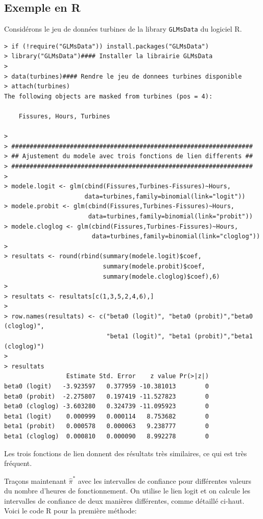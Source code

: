 \documentclass[11pt]{article}
\begin{document}
\subsection{Exemple en R}

Considérons le jeu de données \textsf{turbines} de la library \texttt{GLMsData} du logiciel \textrm{R}.

\begin{verbatim}
> if (!require("GLMsData")) install.packages("GLMsData")
> library("GLMsData")#### Installer la librairie GLMsData
> 
> data(turbines)#### Rendre le jeu de donnees turbines disponible
> attach(turbines)
The following objects are masked from turbines (pos = 4):

    Fissures, Hours, Turbines

> 
> ##################################################################
> ## Ajustement du modele avec trois fonctions de lien differents ##
> ##################################################################
> 
> modele.logit <- glm(cbind(Fissures,Turbines-Fissures)~Hours,
                      data=turbines,family=binomial(link="logit"))
> modele.probit <- glm(cbind(Fissures,Turbines-Fissures)~Hours,
                       data=turbines,family=binomial(link="probit"))
> modele.cloglog <- glm(cbind(Fissures,Turbines-Fissures)~Hours,
                        data=turbines,family=binomial(link="cloglog"))
> 
> resultats <- round(rbind(summary(modele.logit)$coef,
                           summary(modele.probit)$coef,
                           summary(modele.cloglog)$coef),6)
> 
> resultats <- resultats[c(1,3,5,2,4,6),]
> 
> row.names(resultats) <- c("beta0 (logit)", "beta0 (probit)","beta0 (cloglog)",
                            "beta1 (logit)", "beta1 (probit)","beta1 (cloglog)")
> 
> resultats
                 Estimate Std. Error    z value Pr(>|z|)
beta0 (logit)   -3.923597   0.377959 -10.381013        0
beta0 (probit)  -2.275807   0.197419 -11.527823        0
beta0 (cloglog) -3.603280   0.324739 -11.095923        0
beta1 (logit)    0.000999   0.000114   8.753682        0
beta1 (probit)   0.000578   0.000063   9.238777        0
beta1 (cloglog)  0.000810   0.000090   8.992278        0
\end{verbatim}

\noindent Les trois fonctions de lien donnent des résultats très similaires, ce qui est très fréquent.

\noindent Tra\c{c}ons maintenant $\hat\pi^*$ avec les intervalles de confiance pour différentes valeurs du nombre d'heures de fonctionnement. On utilise le lien logit et on calcule les intervalles de confiance de deux manières différentes, comme détaillé ci-haut. Voici le code \textrm{R} pour la première méthode:
\end{document}
